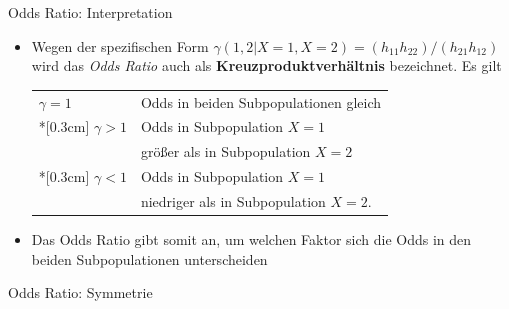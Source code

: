 \documentclass[
  10pt,
  ignorenonframetext,
]{beamer}
\providecommand{\tightlist}{%
  \setlength{\itemsep}{0pt}\setlength{\parskip}{0pt}}
\begin{document}
\begin{frame}{Odds Ratio: Interpretation}
\protect\hypertarget{odds-ratio-interpretation}{}
\begin{itemize}
\item
  Wegen der spezifischen Form
  \(\gamma(1,2|X=1,X=2)=(h_{11}h_{22})/(h_{21}h_{12})\) wird das
  \emph{Odds Ratio} auch als \textbf{Kreuzproduktverhältnis} bezeichnet.
  Es gilt

  \begin{center}
    \begin{tabular}{ll}
    $\gamma =1$ \hspace{1cm}& Odds in beiden Subpopulationen gleich\\*[0.3cm]
    $\gamma > 1$ & Odds in Subpopulation $X=1$ \\
    & größer als in Subpopulation $X=2$\\*[0.3cm]
    $\gamma < 1$ & Odds in Subpopulation $X=1$ \\
    & niedriger als in Subpopulation $X=2$.
    \end{tabular}
    \end{center}
    \vspace*{0.3cm}
\item
  Das Odds Ratio gibt somit an, um welchen Faktor sich die Odds in den
  beiden Subpopulationen unterscheiden
\end{itemize}
\end{frame}

\begin{frame}{Odds Ratio: Symmetrie}
\protect\hypertarget{odds-ratio-symmetrie}{}
\end{frame}
\end{document}

